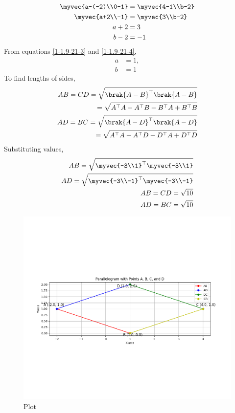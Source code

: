 \documentclass[journal]{IEEEtran}
\begin{document}
 \begin{align}
\myvec{a-(-2)\\0-1}&=\myvec{4-1\\b-2}\label{1-1.9-21-1}\\
\myvec{a+2\\-1}&=\myvec{3\\b-2}\label{1-1.9-21-2}\\
a+2&=3\label{1-1.9-21-3}\\
b-2&=-1\label{1-1.9-21-4}
\end{align}
 From equations \eqref{1-1.9-21-3} and \eqref{1-1.9-21-4}, 
\begin{align}
a&=1,\\
b&=1
\end{align}
To find lengths of sides,
\begin{align}
AB=CD=\sqrt{\brak{A-B}^\top\brak{A-B}}\\
=\sqrt{A^\top A-A^\top B -B^\top A+B^\top B }\label{1-1.9-21-5}\\
AD=BC=\sqrt{\brak{A-D}^\top\brak{A-D}}\\
=\sqrt{A^\top A-A^\top D -D^\top A+D^\top D }\label{1-1.9-21-6}\\
\end{align}
Substituting values,
\begin{align}
AB=\sqrt{\myvec{-3\\1}^\top \myvec{-3\\1}}\\
AD=\sqrt{\myvec{-3\\-1}^\top \myvec{-3\\-1}}\\
AB=CD=\sqrt{10}\label{1-1.9-21-7}\\
AD=BC=\sqrt{10}\label{1-1.9-21-8}
\end{align}
\begin{figure}[h!]
   \centering
   \includegraphics[width=1.1\linewidth]{Figs/Figure1.png}
   \caption{Plot}
   \label{1-1.9-21-fig-1}
\end{figure}
\end{document}
